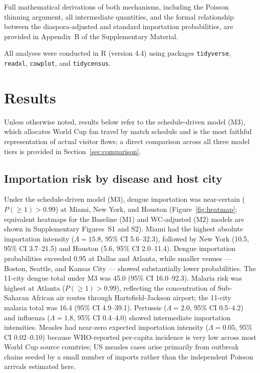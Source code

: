 \documentclass[12pt, a4paper]{article}
\begin{document}
Full mathematical derivations of both mechanisms, including the
Poisson thinning argument, all intermediate quantities, and the
formal relationship between the diaspora-adjusted and standard
importation probabilities, are provided in Appendix~B of the
Supplementary Material.

All analyses were conducted in R (version 4.4) using packages
\texttt{tidyverse}, \texttt{readxl}, \texttt{cowplot}, and
\texttt{tidycensus}.

\section{Results}

Unless otherwise noted, results below refer to the schedule-driven
model (M3), which allocates World Cup fan travel by match schedule
and is the most faithful representation of actual visitor flows; a
direct comparison across all three model tiers is provided in
Section~\ref{sec:comparison}.

\subsection{Importation risk by disease and host city}

Under the schedule-driven model (M3), dengue importation was
near-certain ($P(\geq 1) > 0.99$) at Miami, New York, and Houston
(Figure~\ref{fig:heatmap}; equivalent heatmaps for the Baseline (M1)
and WC-adjusted (M2) models are shown in Supplementary Figures~S1
and S2). Miami had the highest absolute
importation intensity ($\Lambda = 15.8$, 95\% CI 5.6--32.3),
followed by New York (10.5, 95\% CI 3.7--21.5) and Houston (5.6,
95\% CI 2.0--11.4). Dengue importation probabilities exceeded 0.95 at
Dallas and Atlanta, while smaller venues --- Boston, Seattle, and
Kansas City --- showed substantially lower probabilities. The
11-city dengue total under M3 was 45.0 (95\% CI 16.0--92.3).
Malaria risk was highest at Atlanta ($P(\geq 1) > 0.99$),
reflecting the concentration of Sub-Saharan African air routes
through Hartsfield-Jackson airport; the 11-city malaria total was
16.4 (95\% CI 4.9--39.1). Pertussis ($\Lambda = 2.0$, 95\% CI
0.5--4.2) and influenza ($\Lambda = 1.8$, 95\% CI 0.4--4.0) showed
intermediate importation intensities. Measles had near-zero expected
importation intensity ($\Lambda = 0.05$, 95\% CI 0.02--0.10) because
WHO-reported per-capita incidence is very low across most World Cup
source countries; US measles cases arise primarily from outbreak
chains seeded by a small number of imports rather than the independent
Poisson arrivals estimated here.
\end{document}

